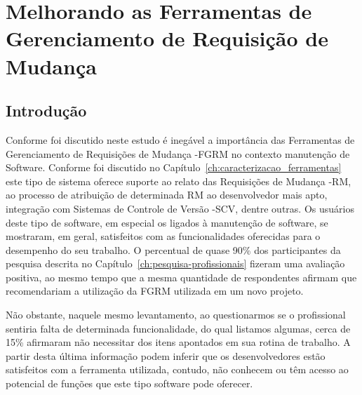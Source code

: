 \chapter{Melhorando as Ferramentas de Gerenciamento de Requisição de Mudança}
\label{ch:sug_melhoria}

\section{Introdução}
\label{sec:sug_melhoria_intro}

Conforme foi discutido neste estudo é inegável a importância das Ferramentas de
Gerenciamento de Requisições de Mudança \@-\@ FGRM no contexto manutenção de
Software. Conforme foi discutido no
Capítulo~\ref{ch:caracterizacao_ferramentas} este tipo de sistema oferece
suporte ao relato das Requisições de Mudança \@-\@ RM, ao processo de
atribuição de determinada RM ao desenvolvedor mais apto, integração com
Sistemas de Controle de Versão \@-\@ SCV, dentre outras. Os usuários deste tipo
de software, em especial os ligados à manutenção de software, se mostraram, em
geral, satisfeitos com as funcionalidades oferecidas para o desempenho do seu
trabalho. O percentual de quase 90\% dos participantes da pesquisa descrita no
Capítulo~\ref{ch:pesquisa-profissionais} fizeram uma avaliação positiva, ao
mesmo tempo que a mesma quantidade de respondentes afirmam que recomendariam a
utilização da FGRM utilizada em um novo projeto.

Não obstante, naquele mesmo levantamento, ao questionarmos se o profissional
sentiria falta de determinada funcionalidade, do qual listamos algumas, cerca de
15\% afirmaram não necessitar dos itens apontados em sua rotina de trabalho. A
partir desta última informação podem inferir que os desenvolvedores estão
satisfeitos com a ferramenta utilizada, contudo, não conhecem ou têm acesso ao
potencial de funções que este tipo software pode oferecer.

